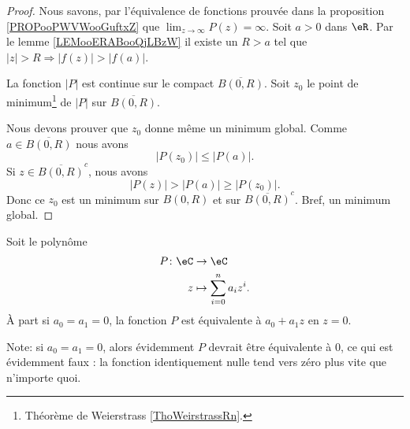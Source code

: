 \begin{proof}
	Nous savons, par l'équivalence de fonctions prouvée dans la proposition \ref{PROPooPWVWooGuftxZ} que \( \lim_{z\to \infty} P(z)=\infty\). Soit \( a>0\) dans \( \eR\). Par le lemme \ref{LEMooERABooQjLBzW} il existe un \( R>a\) tel que \( | z |>R\Rightarrow | f(z) |>| f(a) |\).

	La fonction \( | P |\) est continue sur le compact \( \overline{ B(0,R) }\). Soit \( z_0\) le point de minimum\footnote{Théorème de Weierstrass \ref{ThoWeirstrassRn}.} de \( | P |\) sur \( \overline{ B(0,R) }\).

	Nous devons prouver que \( z_0\) donne même un minimum global. Comme \( a\in\overline{ B(0,R) }\) nous avons
	\begin{equation}
		| P(z_0) |\leq | P(a) |.
	\end{equation}
	Si \( z\in \overline{ B(0,R) }^c\), nous avons
	\begin{equation}
		| P(z) |>| P(a) |\geq | P(z_0) |.
	\end{equation}
	Donc ce \( z_0\) est un minimum sur \( B(0,R)\) et sur \( \overline{ B(0,R) }^c\). Bref, un minimum global.
\end{proof}

\begin{lemma}       \label{LEMooTTOYooXaukuH}
	Soit le polynôme
	\begin{equation}
		\begin{aligned}
			P\colon \eC & \to \eC                     \\
			z           & \mapsto \sum_{i=0}^na_iz^i.
		\end{aligned}
	\end{equation}
	À part si \( a_0=a_1=0\), la fonction \( P\) est équivalente à \( a_0+a_1z\) en \( z=0\).
\end{lemma}

Note: si \( a_0=a_1=0\), alors évidemment \( P\) devrait être équivalente à \( 0\), ce qui est évidemment faux : la fonction identiquement nulle tend vers zéro plus vite que n'importe quoi.

